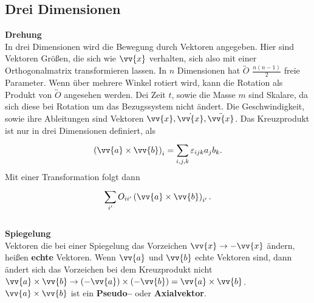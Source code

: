 \documentclass[a4paper,12pt]{article}
\numberwithin{equation}{section}
\begin{document}
\subsection{Drei Dimensionen}
\textbf{Drehung}\\ 
In drei Dimensionen wird die Bewegung durch Vektoren angegeben. Hier sind Vektoren Größen, die sich wie $\vv{x}$ verhalten, sich also mit einer Orthogonalmatrix transformieren lassen. In $n$ Dimensionen hat $\overleftrightarrow{O}$ $\tfrac{n(n-1)}{2}$ freie Parameter. Wenn über mehrere Winkel rotiert wird, kann die Rotation als Produkt von $\overleftrightarrow{O}$ angesehen werden. Dei Zeit $t$, sowie die Masse $m$ sind Skalare, da sich diese bei Rotation um das Bezugssystem nicht ändert. Die Geschwindigkeit, sowie ihre Ableitungen sind Vektoren $\vv{x},\dot{\vv{x}},\ddot{\vv{x}}$. Das Kreuzprodukt ist nur in drei Dimensionen definiert, als 
\[ 
        \left(\vv{a}\times \vv{b}\right)_i=\sum_{i,j,k}^{}\varepsilon _{ijk}a_jb_k   
.\]
Mit einer Transformation folgt dann
\[ 
        \sum_{i'}^{}O_{ii'}\left(\vv{a}\times \vv{b}\right)_{i'}
.\] 
\hfill\\\textbf{Spiegelung}\\ 
Vektoren die bei einer Spiegelung das Vorzeichen $\vv{x}\rightarrow -\vv{x}$ ändern, heißen \textbf{echte} Vektoren. Wenn $\vv{a}$ und $\vv{b}$ echte Vektoren sind, dann ändert sich das Vorzeichen bei dem Kreuzprodukt nicht $\vv{a}\times \vv{b}\rightarrow \left(-\vv{a}\right)\times\left(-\vv{b}\right)=\vv{a}\times \vv{b}$. $\vv{a}\times \vv{b}$ ist ein \textbf{Pseudo--} oder \textbf{Axialvektor}.
\end{document}
